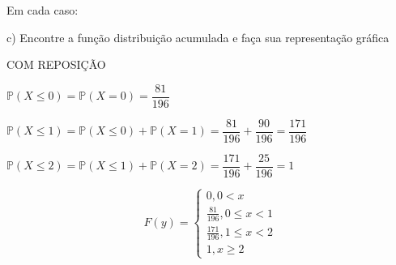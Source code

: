 \documentclass[12pt,a4paper]{article}
\begin{document}
\vspace{1cm}
Em cada caso:

c) Encontre a função distribuição acumulada e faça sua representação gráfica

\vspace{0.25cm}
COM REPOSIÇÃO
\begin{center}
	\vspace{0.25cm}
	$\mathbb{P}(X\leq{0}) = \mathbb{P}(X=0) = \dfrac{81}{196}$
	
	\vspace{0.5cm}
	$\mathbb{P}(X\leq1) = \mathbb{P}(X\leq{0}) + \mathbb{P}(X=1) = \dfrac{81}{196} + \dfrac{90}{196} = \dfrac{171}{196}$
	
	\vspace{0.5cm}
	$\mathbb{P}(X\leq{2}) = \mathbb{P}(X\leq1) + \mathbb{P}(X=2) = \dfrac{171}{196} + \dfrac{25}{196} = 1$
	
	\[
	F(y) =
	\begin{cases}
	0, 0 < x \\
	\frac{81}{196}, 0\leq{x} < 1 \\
	\frac{171}{196}, 1\leq{x} < 2\\
	1,x\geq{2}
	\end{cases}
	\]
	
	\vspace{1cm}
\end{center}

\vspace{1cm}
\end{document}
